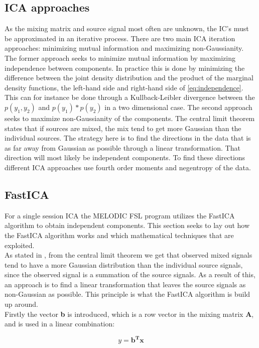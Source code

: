 \subsection{ICA approaches}
As the mixing matrix and source signal most often are unknown, the IC’s must be approximated in an iterative process. There are two main ICA iteration approaches: minimizing mutual information and maximizing non-Gaussianity. The former approach seeks to minimize mutual information by maximizing independence between components. In practice this is done by minimizing the difference between the joint density distribution and the product of the marginal density functions, the left-hand side and right-hand side of \eqref{eq:independence}. This can for instance be done through a Kullback-Leibler divergence between the $p(y_1,y_2)$ and $p(y_1)*p(y_2)$ in a two dimensional case.
The second approach seeks to maximize non-Gaussianity of the components. The central limit theorem states that if sources are mixed, the mix tend to get more Gaussian than the individual sources. The strategy here is to find the directions in the data that is as far away from Gaussian as possible through a linear transformation. That direction will most likely be independent components. To find these directions different ICA approaches use fourth order moments and negentropy of the data. \cite{Hyvarinen2001} 

\subsection{FastICA}
For a single session ICA the MELODIC FSL program utilizes the FastICA algorithm to obtain independent components. This section seeks to lay out how the FastICA algorithm works and which mathematical techniques that are exploited. \\
As stated in , from the central limit theorem we get that observed mixed signals tend to have a more Gaussian distribution than the individual source signals, since the observed signal is a summation of the source signals. As a result of this, an approach is to find a linear transformation that leaves the source signals as non-Gaussian as possible. This principle is what the FastICA algorithm is build up around. \\
Firstly the vector \textbf{b} is introduced, which is a row vector in the mixing matrix \textbf{A}, and is used in a linear combination:

\begin{equation}
y = \mathbf{b^T}\mathbf{x}
\end{equation}

